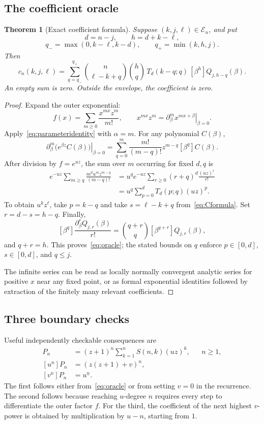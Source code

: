 \documentclass[11pt]{article}
\numberwithin{equation}{section}
\newtheorem{theorem}{Theorem}[section]
\theoremstyle{definition}
\theoremstyle{remark}
\newcommand{\fall}[2]{#1^{\underline{#2}}}
\begin{document}
\subsection{The coefficient oracle}

\begin{theorem}[Exact coefficient formula]\label{thm:oracle}
Suppose $(k,j,\ell)\in\mathcal E_n$, and put
\[
 d=n-j,\qquad h=d+k-\ell,
\]
\[
 q_- =\max(0,k-\ell,k-d),\qquad q_+=\min(k,h,j).
\]
Then
\begin{equation}\label{eq:oracle}
\boxed{\displaystyle
 c_n(k,j,\ell)=\sum_{q=q_-}^{q_+}
 \binom n{\ell-k+q}\binom hq\,
 T_d(k-q;q)\,[\beta^h]Q_{j,h-q}(\beta).}
\end{equation}
An empty sum is zero. Outside the envelope, the coefficient is zero.
\end{theorem}
\begin{proof}
Expand the outer exponential:
\[
 f(x)=\sum_{m\ge0}\frac{x^{mx}z^m}{m!},\qquad
 x^{mx}z^m=\left.\partial_\beta^m x^{mx+\beta}\right|_{\beta=0}.
\]
Apply~\eqref{eq:parameteridentity} with $\alpha=m$. For any polynomial
$C(\beta)$,
\[
 \left.\partial_\beta^m\bigl(e^{\beta z}C(\beta)\bigr)\right|_{\beta=0}
 =\sum_{q=0}^m\frac{m!}{(m-q)!}z^{m-q}[\beta^q]C(\beta).
\]
After division by $f=e^{uz}$, the sum over $m$ occurring for fixed $d,q$ is
\begin{align*}
 e^{-uz}\sum_{m\ge q}\frac{m^d u^m z^{m-q}}{(m-q)!}
 &=u^q e^{-uz}\sum_{r\ge0}(r+q)^d\frac{(uz)^r}{r!}\\
 &=u^q\sum_{p=0}^dT_d(p;q)(uz)^p.
\end{align*}
To obtain $u^kz^\ell$, take $p=k-q$ and take
$s=\ell-k+q$ from~\eqref{eq:Cformula}. Set $r=d-s=h-q$.
Finally,
\[
 [\beta^q]\frac{\partial_\beta^rQ_{j,r}(\beta)}{r!}
 =\binom{q+r}{q}[\beta^{q+r}]Q_{j,r}(\beta),
\]
and $q+r=h$. This proves~\eqref{eq:oracle}; the stated bounds on $q$ enforce
$p\in[0,d]$, $s\in[0,d]$, and $q\le j$.

The infinite series can be read as locally normally convergent analytic
series for positive $x$ near any fixed point, or as formal exponential
identities followed by extraction of the finitely many relevant coefficients.
\end{proof}

\subsection{Three boundary checks}

Useful independently checkable consequences are
\begin{align}
 [v^0]P_n&=(z+1)^n\sum_{k=1}^nS(n,k)(uz)^k,
                 &&n\ge1,\label{eq:vzero}\\
 [u^n]P_n&=(z(z+1)+v)^n,\label{eq:umax}\\
 [v^n]P_n&=\fall{u}{n}.\label{eq:vmax}
\end{align}
The first follows either from~\eqref{eq:oracle} or from setting $v=0$ in the
recurrence. The second follows because reaching $u$-degree $n$ requires every
step to differentiate the outer factor $f$. For the third, the coefficient
of the next highest $v$-power is obtained by multiplication by $u-n$,
starting from $1$.
\end{document}
